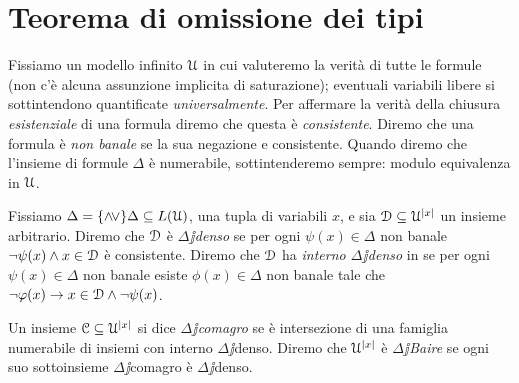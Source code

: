 \section{Teorema di omissione dei tipi}\label{paragrafoOTT}

Fissiamo un modello infinito $\EuScript U$ in cui valuteremo la verit\`a di tutte le formule (non c'\`e alcuna assunzione implicita di saturazione); eventuali variabili libere si sottintendono quantificate \textit{universalmente}. Per affermare la verit\`a della chiusura \textit{esistenziale\/} di una formula diremo che questa \`e \textit{consistente}.  Diremo che una formula \`e \emph{non banale\/} se la sua negazione e consistente. Quando diremo che l'insieme di formule $\Delta$ \`e numerabile, sottintenderemo sempre: modulo equivalenza in $\EuScript U$.

\begin{definition}\label{def_Delta_Baire} Fissiamo $\Delta=\{\wedge\!\vee\}\Delta\subseteq L(\EuScript U)$, una tupla di variabili $x$, e sia $\EuScript D\subseteq\EuScript U^{|x|}$ un insieme arbitrario. Diremo che $\EuScript D$ \`e \emph{$\Delta\jj$denso\/} se per ogni $\psi(x)\in\Delta$ non banale $\neg\psi(x)\wedge x\in\EuScript D$ \`e consistente.  Diremo che $\EuScript D$ ha \emph{interno $\Delta\jj$denso\/} in  se per ogni $\psi(x)\in\Delta$ non banale esiste $\phi(x)\in\Delta$ non banale tale che $\neg\varphi(x)\rightarrow x\in\EuScript D\wedge\neg\psi(x)$.

Un insieme $\EuScript C\subseteq\EuScript U^{|x|}$ si dice \emph{$\Delta\jj$comagro\/} se \`e intersezione di una famiglia numerabile di insiemi con interno $\Delta\jj$denso. Diremo che $\EuScript U^{|x|}$ \`e \emph{$\Delta\jj$Baire\/} se ogni suo sottoinsieme $\Delta\jj$comagro \`e $\Delta\jj$denso.\QED
\end{definition}
% 
% 
% 

